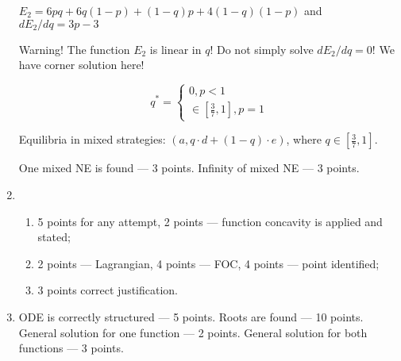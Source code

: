 \begin{enumerate}
    
    $E_2=6pq+6q(1-p)+(1-q)p+4(1-q)(1-p)$ and $dE_2/dq=3p-3$

    Warning! The function $E_2$ is linear in $q$! Do not simply solve $dE_2/dq=0$! 
    We have corner solution here!

    \[
      q^*=\begin{cases}
        0, p<1 \\
        \in \left[ \frac{3}{7},1 \right], p=1
    \end{cases}
    \]

    Equilibria in mixed strategies: $(a,q\cdot d+(1-q)\cdot e)$, where $q\in\left[ \frac{3}{7}, 1\right]$.
    
    One mixed NE is found — 3 points. Infinity of mixed NE — 3 points.

    \item 
    \begin{enumerate}
      \item 5 points for any attempt, 2 points — function concavity is applied and stated;
      \item 2 points — Lagrangian, 4 points — FOC, 4 points — point identified;
      \item 3 points correct justification.
    \end{enumerate}
    
    \item  ODE is correctly structured — 5 points. Roots are found — 10 points.
    General solution for one function  — 2 points.
    General solution for both functions — 3 points.
  
\end{enumerate}